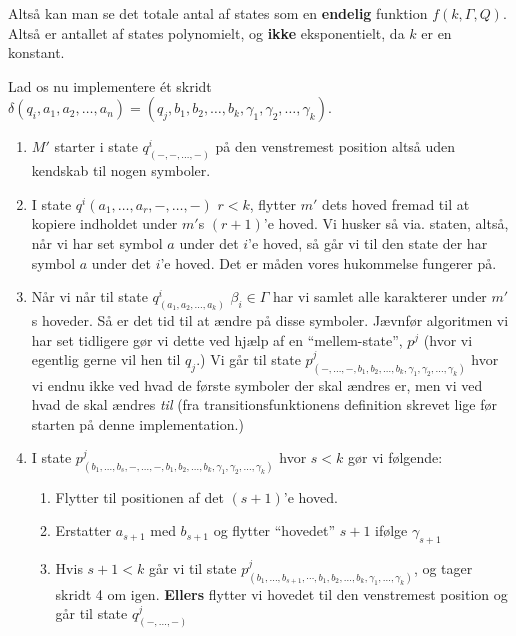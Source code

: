 Altså kan man se det totale antal af states som en \textbf{endelig} funktion $f(k, \Gamma, Q)$. Altså er antallet af states polynomielt, og \textbf{ikke} eksponentielt, da $k$ er en konstant.

Lad os nu implementere ét skridt $\delta(q_{i}, a_{1}, a_{2}, \ldots, a_{n}) = (q_{j}, b_{1}, b_{2}, \ldots, b_{k}, \gamma_{1}, \gamma_{2}, \ldots, \gamma_{k})$.
\begin{enumerate}
	\item $M'$ starter i state $q^{i}_{(-,-, \ldots, -)}$ på den venstremest position altså uden kendskab til nogen symboler.
	\item I state $q^{i}(a_{1}, \ldots, a_{r}, -, \ldots, -)$ $r < k$, flytter $m'$ dets hoved fremad til at kopiere indholdet under $m'$s $(r+1)$'e hoved. Vi husker så via. staten, altså, når vi har set symbol $a$ under det $i$'e hoved, så går vi til den state der har symbol $a$ under det $i$'e hoved. Det er måden vores hukommelse fungerer på.
	\item Når vi når til state $q^{i}_{(a_{1}, a_{2}, \ldots, a_{k})}$ $\beta_{i} \in \Gamma$ har vi samlet alle karakterer under $m'$s hoveder. Så er det tid til at ændre på disse symboler. Jævnfør algoritmen vi har set tidligere gør vi dette ved hjælp af en ``mellem-state'', $p^{j}$ (hvor vi egentlig gerne vil hen til $q_{j}$.) Vi går til state $p^{j}_{(-, \ldots, -, b_{1}, b_{2}, \ldots, b_{k}, \gamma_{1}, \gamma_{2}, \ldots, \gamma_{k})}$ hvor vi endnu ikke ved hvad de første symboler der skal ændres er, men vi ved hvad de skal ændres \textit{til} (fra transitionsfunktionens definition skrevet lige før starten på denne implementation.)
	\item I state $p^{j}_{(b_{1}, \ldots, b_{s}, -, \ldots, -, b_{1}, b_{2}, \ldots, b_{k}, \gamma_{1}, \gamma_{2}, \ldots, \gamma_{k})}$ hvor $s < k$ gør vi følgende:
	      \begin{enumerate}
		      \item Flytter til positionen af det $(s+1)$'e hoved.
		      \item Erstatter $a_{s+1}$ med $b_{s+1}$ og flytter ``hovedet'' $s+1$ ifølge $\gamma_{s+1}$
		      \item Hvis $s+1<k$ går vi til state $p^{j}_{(b_{1}, \ldots, b_{s+1}, \cdots, b_{1}, b_{2}, \ldots, b_{k}, \gamma_{1}, \ldots, \gamma_{k})}$, og tager skridt 4 om igen. \textbf{Ellers} flytter vi hovedet til den venstremest position og går til state $q^{j}_{(-, \ldots, -)}$
	      \end{enumerate}
\end{enumerate}

